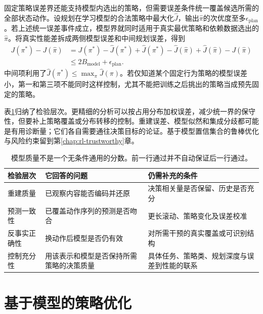固定策略误差界还能支持模型内选出的策略，但需要误差条件统一覆盖候选所需的全部状态动作。设规划在学习模型的合法策略中最大化$\widehat J$，输出$\widehat\pi$的次优度至多$\epsilon_{\mathrm{plan}}$。若上述统一误差事件成立，模型界就同时适用于真实最优策略和依赖数据选出的$\widehat\pi$。将真实性能差拆成两侧模型误差和中间规划误差，得到
\begin{align*}
  J(\pi^*)-J(\widehat\pi)
   &=J(\pi^*)-\widehat J(\pi^*)
     +\widehat J(\pi^*)-\widehat J(\widehat\pi)
     +\widehat J(\widehat\pi)-J(\widehat\pi)\\
   &\leq 2B_{\mathrm{model}}+\epsilon_{\mathrm{plan}}.
\end{align*}
中间项利用了$\widehat J(\pi^*)\leq\max_\pi\widehat J(\pi)$。若仅知道某个固定行为策略的模型误差小，第一和第三项不能同时这样控制，尤其不能把训练之后挑出的策略当成预先固定的策略。

表\ref{tab:rl-learning-model-validity}归纳了检验层次。更精细的分析可以按占用分布加权误差，减少统一界的保守性，但要补上策略覆盖或分布转移的控制。重建误差、模型似然和集成分歧都可能是有用诊断量；它们各自需要通往决策目标的论证。基于模型置信集合的鲁棒优化与风险约束留到第\ref{chap:rl-trustworthy}章。

\begin{table}[t]
  \centering
  \small
  \begin{tabularx}{\linewidth}{>{\raggedright\arraybackslash}p{24mm} >{\raggedright\arraybackslash}X >{\raggedright\arraybackslash}X}
    \toprule
    检验层次 & 它回答的问题 & 仍需补充的条件 \\
    \midrule
    重建质量 & 已观察内容能否编码并还原 & 决策相关量是否保留、历史是否充分 \\
    预测一致性 & 已覆盖动作序列的预测是否吻合 & 更长滚动、策略变化及误差校准 \\
    反事实正确性 & 换动作后模型是否仍有效 & 对所需干预的真实覆盖或可识别结构 \\
    控制充分性 & 用该表示和模型是否保持所需策略的决策质量 & 具体任务、策略类、规划深度与误差到性能的联系 \\
    \bottomrule
  \end{tabularx}
  \caption{模型质量不是一个无条件通用的分数。前一行通过并不自动保证后一行通过。}
  \label{tab:rl-learning-model-validity}
\end{table}

\section{基于模型的策略优化}
\label{sec:rl-learning-model-policy}

